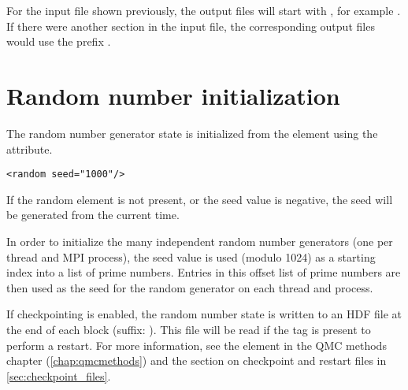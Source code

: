 For the input file shown previously, the output files will start with , for example .
If there were another  section in the input file, the corresponding output files would use the prefix .



\section{Random number initialization}

The random number generator state is initialized from the  element using the  attribute.
\begin{lstlisting}[style=QMCPXML]
<random seed="1000"/>
\end{lstlisting}

If the random element is not present, or the seed value is negative, the seed will be generated from the current time.

In order to initialize the many independent random number generators (one per thread and MPI process), the seed value is used (modulo 1024) as a starting index into a list of prime numbers.
Entries in this offset list of prime numbers are then used as the seed for the random generator on each thread and process.

If checkpointing is enabled, the random number state is written to an HDF file at the end of each block (suffix: ).
This file will be read if the  tag is present to perform a restart.
For more information, see the  element in the QMC methods chapter (\ref{chap:qmcmethods}) and the section on checkpoint and restart files in \ref{sec:checkpoint_files}.
